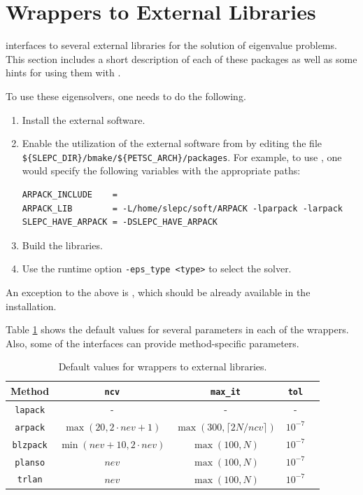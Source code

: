 \section{Wrappers to External Libraries}
\label{sec:wrap}

	\slepc interfaces to several external libraries for the solution of eigenvalue problems. This section includes a short description of each of these packages as well as some hints for using them with \slepc.

	To use these eigensolvers, one needs to do the following.
	\begin{enumerate}
	\item Install the external software.
	\item Enable the utilization of the external software from \slepc by editing the file \Verb!${SLEPC_DIR}/bmake/${PETSC_ARCH}/packages!. For example, to use \arpack, one would specify the following variables with the appropriate paths:
	\begin{Verbatim}[fontsize=\small]
ARPACK_INCLUDE    = 
ARPACK_LIB        = -L/home/slepc/soft/ARPACK -lparpack -larpack
SLEPC_HAVE_ARPACK = -DSLEPC_HAVE_ARPACK
	\end{Verbatim}
	\item Build the \slepc libraries.
	\item Use the runtime option \Verb!-eps_type <type>! to select the solver.
	\end{enumerate}

	An exception to the above is \lapack, which should be already available in the \petsc{} installation.

	Table \ref{tab:defaults-ext} shows the default values for several parameters in each of the wrappers. Also, some of the interfaces can provide method-specific parameters.
\begin{table}[ht]
\centering
\begin{tabular}{ccccc} \hline
Method   &  \texttt{ncv} & \texttt{max\_it} & \texttt{tol} \\ \hline
\texttt{lapack}   &  - &         -          &    -      \\ 
\texttt{arpack}   &  $\max(20,2\!\cdot\!nev\!+\!\!1)$ & $\max(300,\lceil 2N/ncv\rceil)$ & $10^{-7}$ \\ 
\texttt{blzpack}  &  $\min(nev\!+\!\!10,2\!\cdot\!nev)$ & $\max(100,N)$ & $10^{-7}$ \\ 
\texttt{planso}   &  $nev$ & $\max(100,N)$ & $10^{-7}$ \\ 
\texttt{trlan}    &  $nev$ & $\max(100,N)$ & $10^{-7}$ \\ \hline
\end{tabular}
\caption{\label{tab:defaults-ext}Default values for wrappers to external
libraries.}
\end{table}

